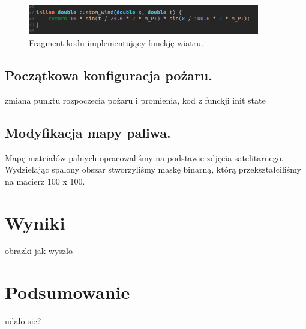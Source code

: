 \documentclass[onecolumn,12pt]{article}
\begin{document}
\begin{figure}[h]
    \centering
    \includegraphics[width=0.9\textwidth]{custom_wind.png}
    \caption{Fragment kodu implementujący funckję wiatru.}
    \label{fig:example}
\end{figure}


\subsection{Początkowa konfiguracja pożaru.}
zmiana punktu rozpoczecia pożaru i promienia, kod z funckji init state

\subsection{Modyfikacja mapy paliwa.}
Mapę mateiałów palnych opracowaliśmy na podstawie zdjęcia satelitarnego. Wydzielając spalony obszar stworzyliśmy maskę binarną, którą przekształciliśmy na macierz 100 x 100. 


\section{Wyniki}
obrazki jak wyszlo

\section{Podsumowanie}
udalo sie? 

%
\end{document}
